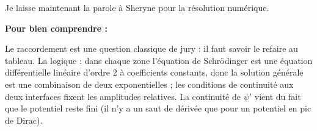 \documentclass[11pt,a4paper]{article}
\newenvironment{comprendre}%
{\par\medskip\noindent\hrulefill\par\nopagebreak\textbf{Pour bien comprendre :}\itshape\par}%
{\par\nopagebreak\noindent\hrulefill\par\medskip}
\begin{document}
	Je laisse maintenant la parole à Sheryne pour la résolution numérique.
	
	\begin{comprendre}
		Le raccordement est une question classique de jury : il faut savoir le refaire
		au tableau. La logique : dans chaque zone l'équation de Schrödinger est une
		équation différentielle linéaire d'ordre 2 à coefficients constants, donc la
		solution générale est une combinaison de deux exponentielles ; les conditions de
		continuité aux deux interfaces fixent les amplitudes relatives. La continuité de
		$\psi'$ vient du fait que le potentiel reste fini (il n'y a un saut de dérivée
		que pour un potentiel en pic de Dirac).
	\end{comprendre}
	
\end{document}
